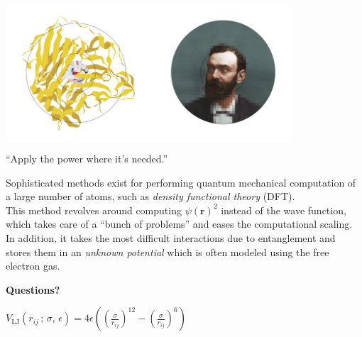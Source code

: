 \documentclass[
paper=128mm:96mm, %
fontsize=11pt, %
pagesize, %
parskip=half-, %
]{scrartcl} %
\theoremstyle{mythmstyle} %
\begin{document}
\begin{center}
\includegraphics[width=0.8\textwidth]{multiscaleImage}
\end{center}

``Apply the power where it's needed.''

\clearpage


Sophisticated methods exist for performing quantum mechanical computation of a large number of atoms, such as \textit{density functional theory} (DFT).\\

This method revolves around computing $\psi(\mathbf{r})^2$ instead of the wave function, which takes care of a ``bunch of problems'' and eases the computational scaling. \\

In addition, it takes the most difficult interactions due to entanglement and stores them in an \textit{unknown potential} which is often modeled using the free electron gas.

\clearpage


\thispagestyle{empty} %

\begin{flushright}
\vspace{0.6cm}
\color{white}\sffamily
{\bfseries\LARGE Questions?\par} %
\vfill
\end{flushright}



\clearpage
$V_\mathrm{LJ}(r_{ij}\,;\,\sigma,\,\epsilon) = 4\epsilon \left(\left(\frac{\sigma}{r_{ij}}\right)^{12} - \left(\frac{\sigma}{r_{ij}}\right)^{6}\right)$


\end{document}

